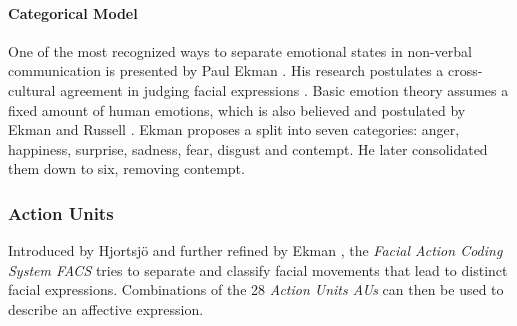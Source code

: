 \paragraph{Categorical Model}
One of the most recognized ways to separate emotional states in non-verbal communication is presented by Paul Ekman \cite{ekman1987universals} \cite{ekman2013emotion}. His research postulates a cross-cultural agreement in judging facial expressions \cite{ekman1987universals}. Basic emotion theory assumes a fixed amount of human emotions, which is also believed and postulated by Ekman and Russell \cite{ekman1992basic} \cite{russell2006}. Ekman proposes a split into seven categories: anger, happiness, surprise, sadness, fear, disgust and contempt. He later consolidated them down to six, removing contempt. 




\subsubsection{Action Units}
\label{subsub:au}

Introduced by Hjortsjö \cite{hjortsjo1969man} and further refined by Ekman \cite{friesen1978facial}, the \emph{Facial Action Coding System FACS} tries to separate and classify facial movements that lead to distinct facial expressions. Combinations of the 28 \emph{Action Units AUs} can then be used to describe an affective expression.

